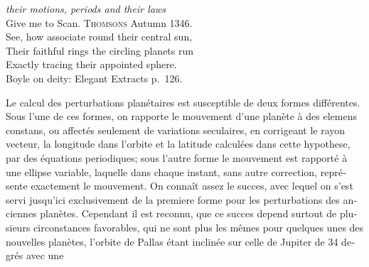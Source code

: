 \documentclass[12pt,a4paper]{article}
\begin{document}
\begin{otherlanguage}{french}
\textit{their motions, periods and their laws}\\
Give me to Scan. \textsc{Thomsons} Autumn 1346.\\[0.3em]
See, how associate round their central sun,\\
Their faithful rings the circling planets run\\
Exactly tracing their appointed sphere.\\
Boyle on deity: Elegant Extracts p.~126.

\medskip
Le calcul des perturbations planétaires est susceptible de deux formes différentes. Sous l'une de ces formes, on rapporte le mouvement d'une planète à des elemens constans, ou affectés seulement de variations seculaires, en corrigeant le rayon vecteur, la longitude dans l'orbite et la latitude calculées dans cette hypothese, par des équations periodiques; sous l'autre forme le mouvement est rapporté à une ellipse variable, laquelle dans chaque instant, sans autre correction, représente exactement le mouvement. On connaît assez le succes, avec lequel on s'est servi jusqu'ici exclusivement de la premiere forme pour les perturbations des anciennes planètes. Cependant il est reconnu, que ce succes depend surtout de plusieurs circonstances favorables, qui ne sont plus les mêmes pour quelques unes des nouvelles planètes, l'orbite de Pallas étant inclinée sur celle de Jupiter de 34 degrés avec une
\end{otherlanguage}
\end{document}
